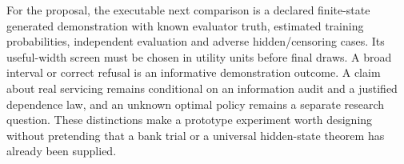 For the proposal, the executable next comparison is a declared
finite-state generated demonstration with known evaluator truth,
estimated training probabilities, independent evaluation and adverse
hidden/censoring cases. Its useful-width screen must be chosen in
utility units before final draws. A broad interval or correct refusal is
an informative demonstration outcome. A claim about real servicing
remains conditional on an information audit and a justified dependence
law, and an unknown optimal policy remains a separate research question.
These distinctions make a prototype experiment worth designing without
pretending that a bank trial or a universal hidden-state theorem has
already been supplied.

\label{exec13:servicing-observed-end}
